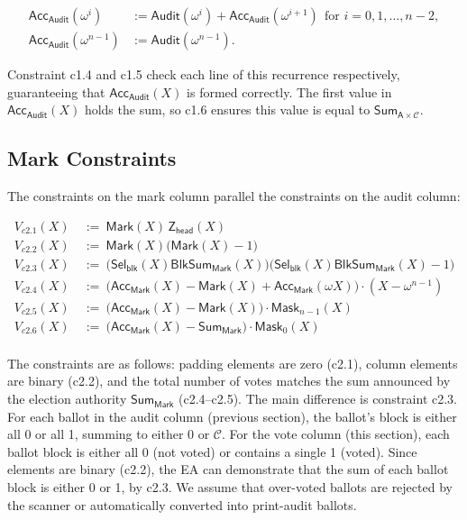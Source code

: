 $$
\begin{aligned}
\mathsf{Acc}_{\mathsf{Audit}}(\omega^{i}) &:= \mathsf{Audit}(\omega^{i}) + \mathsf{Acc}_{\mathsf{Audit}}(\omega^{i+1}) \ \ \text{for } i=0,1,\ldots,n-2,\\
\mathsf{Acc}_{\mathsf{Audit}}(\omega^{n-1}) &:= \mathsf{Audit}(\omega^{n-1}).
\end{aligned}
$$

\noindent Constraint c1.4 and c1.5 check each line of this recurrence respectively, guaranteeing that $\mathsf{Acc}_{\mathsf{Audit}}(X)$ is formed correctly. The first value in $\mathsf{Acc}_{\mathsf{Audit}}(X)$ holds the sum, so c1.6 ensures this value is equal to $\mathsf{Sum}_{\mathsf{A}\times\mathcal{C}}$. 

\subsection{Mark Constraints}
\label{sec:mark}

The constraints on the mark column parallel the constraints on the audit column:

\begin{mdframed}[linewidth=0.6pt,backgroundcolor=verylightpink,innerleftmargin=6pt,innerrightmargin=6pt,innertopmargin=4pt,innerbottommargin=4pt]
\[
\begin{aligned}
V_{c2.1}(X)\ &:=\ \mathsf{Mark}(X)\,\mathsf{Z}_{\mathsf{head}}(X)\\
V_{c2.2}(X)\ &:=\ \mathsf{Mark}(X)\bigl(\mathsf{Mark}(X)-1\bigr)\\
V_{c2.3}(X)\ &:=\ \bigl(\mathsf{Sel}_{\mathsf{blk}}(X)\mathsf{BlkSum}_{\mathsf{Mark}}(X)\bigr)\bigl(\mathsf{Sel}_{\mathsf{blk}}(X)\mathsf{BlkSum}_{\mathsf{Mark}}(X)-1\bigr)\\
V_{c2.4}(X)\ &:=\ \bigl(\mathsf{Acc}_{\mathsf{Mark}}(X)-\mathsf{Mark}(X)+\mathsf{Acc}_{\mathsf{Mark}}(\omega X)\bigr)\cdot(X-\omega^{n-1})\\
V_{c2.5}(X)\ &:=\ \bigl(\mathsf{Acc}_{\mathsf{Mark}}(X)-\mathsf{Mark}(X)\bigr)\cdot \mathsf{Mask}_{n-1}(X)\\
V_{c2.6}(X)\ &:=\ \bigl(\mathsf{Acc}_{\mathsf{Mark}}(X)-\mathsf{Sum}_{\mathsf{Mark}}\bigr)\cdot \mathsf{Mask}_{0}(X)\\
\end{aligned}
\]
\end{mdframed}

\noindent The constraints are as follows: padding elements are zero (c2.1), column elements are binary (c2.2), and the total number of votes matches the sum announced by the election authority $\mathsf{Sum}_{\mathsf{Mark}}$ (c2.4--c2.5). The main difference is constraint c2.3. For each ballot in the audit column (previous section), the ballot's block is either all 0 or all 1, summing to either 0 or $\mathcal{C}$. For the vote column (this section), each ballot block is either all 0 (not voted) or contains a single 1 (voted). Since elements are binary (c2.2), the EA can demonstrate that the sum of each ballot block is either 0 or 1, by c2.3. We assume that over-voted ballots are rejected by the scanner or automatically converted into print-audit ballots.



